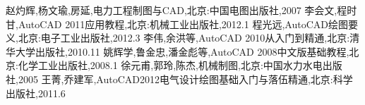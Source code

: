 \begin{thebibliography}{99}
 赵灼辉,杨文瑜,房延,电力工程制图与CAD,北京:中国电图出版社,2007
李会文,程时甘,AutoCAD 2011应用教程,北京:机械工业出版社,2012.1
程光远,AutoCAD绘图要义,北京:电子工业出版社,2012.3
李伟,余洪等,AutoCAD 2010从入门到精通,北京:清华大学出版社,2010.11
姚辉学,鲁金忠,潘金彪等,AutoCAD 2008中文版基础教程,北京:化学工业出版社,2008.1
徐元甫,郭玲,陈杰,机械制图,北京:中国水力水电出版社,2005
王菁,乔建军,AutoCAD2012电气设计绘图基础入门与落伍精通,北京:科学出版社,2011.6
\end{thebibliography}
\endinput